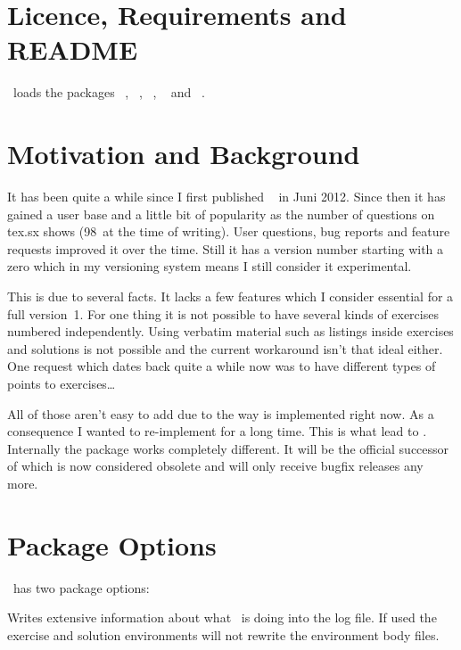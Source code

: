 \documentclass[load-preamble+]{cnltx-doc}
\begin{document}
\section{Licence, Requirements and \textsc{README}}
\license

\xsim\ loads the packages ~\cite{bnd:l3kernel},
~\cite{bnd:l3packages}, ~\cite{pkg:etoolbox},
~\cite{pkg:booktabs} and
~\cite{pkg:translations}.

\section{Motivation and Background}

It has been quite a while since I first published
~\cite{pkg:exsheets} in Juni 2012.  Since then it has gained a
user base and a little bit of popularity as the number of questions on tex.sx
shows (98~at the time of writing).  User questions, bug reports and feature
requests improved it over the time.  Still it has a version number starting
with a zero which in my versioning system means I still consider it
experimental.

This is due to several facts.  It lacks a few features which I consider
essential for a full version~1.  For one thing it is not possible to have
several kinds of exercises numbered independently.  Using verbatim material
such as listings inside exercises and solutions is not possible and the
current workaround isn't that ideal either.  One request which dates back
quite a while now was to have different types of points to exercises\ldots

All of those aren't easy to add due to the way  is implemented
right now. As a consequence I wanted to re-implement  for a long
time.  This is what lead to \xsim.  Internally the package works completely
different. It will be the official successor of  which is now
considered obsolete and will only receive bugfix releases any more.

\section{Package Options}\label{sec:package-options}
\xsim\ has two package options:
\begin{options}
    Writes extensive information about what \xsim\ is doing into the log
    file.
    If used the exercise and solution environments will not rewrite the
    environment body files.
\end{options}
\end{document}
